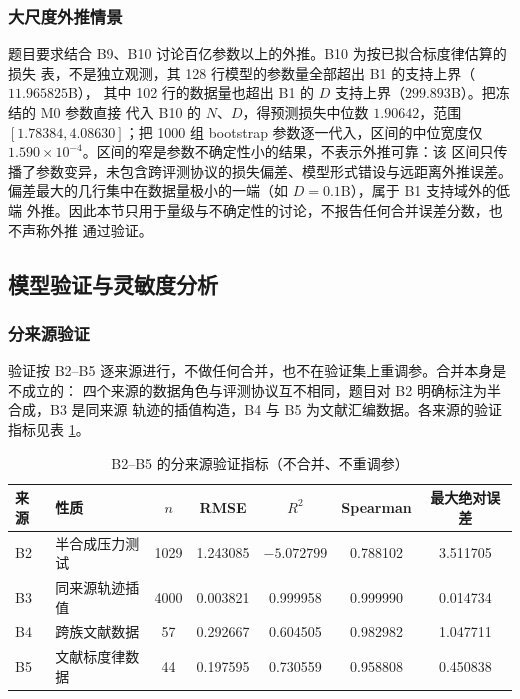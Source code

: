 \documentclass[bwprint]{gmcmthesis}
\numberwithin{equation}{section}
\numberwithin{figure}{section}
\numberwithin{table}{section}
\begin{document}
\subsubsection{大尺度外推情景}

题目要求结合 B9、B10 讨论百亿参数以上的外推。B10 为按已拟合标度律估算的损失
表，不是独立观测，其 128 行模型的参数量全部超出 B1 的支持上界（$11.965825$B），
其中 102 行的数据量也超出 B1 的 $D$ 支持上界（$299.893$B）。把冻结的 M0 参数直接
代入 B10 的 $N$、$D$，得预测损失中位数 $1.90642$，范围
$[1.78384,4.08630]$；把 1000 组 bootstrap 参数逐一代入，区间的中位宽度仅
$1.590\times10^{-4}$。区间的窄是参数不确定性小的结果，不表示外推可靠：该
区间只传播了参数变异，未包含跨评测协议的损失偏差、模型形式错设与远距离外推误差。
偏差最大的几行集中在数据量极小的一端（如 $D=0.1$B），属于 B1 支持域外的低端
外推。因此本节只用于量级与不确定性的讨论，不报告任何合并误差分数，也不声称外推
通过验证。

\subsection{模型验证与灵敏度分析}\label{sec:q2-sens}

\subsubsection{分来源验证}

验证按 B2--B5 逐来源进行，不做任何合并，也不在验证集上重调参。合并本身是不成立的：
四个来源的数据角色与评测协议互不相同，题目对 B2 明确标注为半合成，B3 是同来源
轨迹的插值构造，B4 与 B5 为文献汇编数据。各来源的验证指标见表
\ref{tab:q2-val}。

\begin{table}[htp!]
\centering
\renewcommand\arraystretch{1.2}
\caption{B2--B5 的分来源验证指标（不合并、不重调参）}\label{tab:q2-val}
\begin{tabular*}{\textwidth}{@{\extracolsep{\fill}}llccccc@{}}
\toprule
来源 & 性质 & $n$ & RMSE & $R^2$ & Spearman & 最大绝对误差 \\
\midrule
B2 & 半合成压力测试 & 1029 & 1.243085 & $-5.072799$ & 0.788102 & 3.511705 \\
B3 & 同来源轨迹插值 & 4000 & 0.003821 & 0.999958 & 0.999990 & 0.014734 \\
B4 & 跨族文献数据 & 57 & 0.292667 & 0.604505 & 0.982982 & 1.047711 \\
B5 & 文献标度律数据 & 44 & 0.197595 & 0.730559 & 0.958808 & 0.450838 \\
\bottomrule
\end{tabular*}
\end{table}
\end{document}
